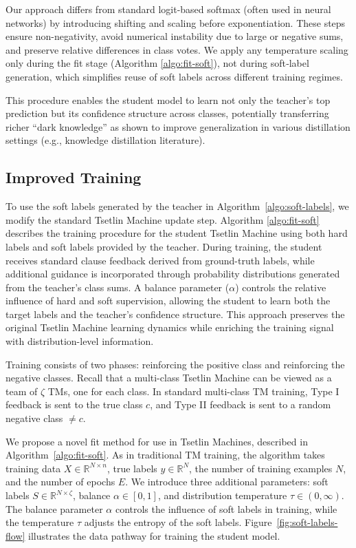 \documentclass[sn-mathphys-num]{sn-jnl}%
\theoremstyle{thmstyleone}%
\theoremstyle{thmstyletwo}%
\theoremstyle{thmstylethree}%
\begin{document}
Our approach differs from standard logit-based softmax (often used in neural networks) by introducing shifting and scaling before exponentiation. These steps ensure non-negativity, avoid numerical instability due to large or negative sums, and preserve relative differences in class votes. We apply any temperature scaling only during the fit stage (Algorithm \ref{algo:fit-soft}), not during soft‑label generation, which simplifies reuse of soft labels across different training regimes.

This procedure enables the student model to learn not only the teacher’s top prediction but its confidence structure across classes, potentially transferring richer “dark knowledge” as shown to improve generalization in various distillation settings (e.g., knowledge distillation literature).  

\subsection{Improved Training} 

To use the soft labels generated by the teacher in Algorithm~\ref{algo:soft-labels}, we modify the standard Tsetlin Machine update step. Algorithm \ref{algo:fit-soft} describes the training procedure for the student Tsetlin Machine using both hard labels and soft labels provided by the teacher. During training, the student receives standard clause feedback derived from ground-truth labels, while additional guidance is incorporated through probability distributions generated from the teacher’s class sums. A balance parameter ($\alpha$) controls the relative influence of hard and soft supervision, allowing the student to learn both the target labels and the teacher’s confidence structure. This approach preserves the original Tsetlin Machine learning dynamics while enriching the training signal with distribution-level information.

Training consists of two phases: reinforcing the positive class and reinforcing the negative classes. Recall that a multi-class Tsetlin Machine can be viewed as a team of $\zeta$ TMs, one for each class. In standard multi-class TM training, Type I feedback is sent to the true class $c$, and Type II feedback is sent to a random negative class $\neq c$.

We propose a novel fit method for use in Tsetlin Machines, described in Algorithm~\ref{algo:fit-soft}. As in traditional TM training, the algorithm takes training data $X \in \mathbb{R}^{N \times n}$, true labels $y \in \mathbb{R}^N$, the number of training examples $N$, and the number of epochs $E$. We introduce three additional parameters: soft labels $S \in \mathbb{R}^{N \times \zeta}$, balance $\alpha \in [0,1]$, and distribution temperature $\tau \in (0,\infty)$. The balance parameter $\alpha$ controls the influence of soft labels in training, while the temperature $\tau$ adjusts the entropy of the soft labels. Figure~\ref{fig:soft-labels-flow} illustrates the data pathway for training the student model.
\end{document}

